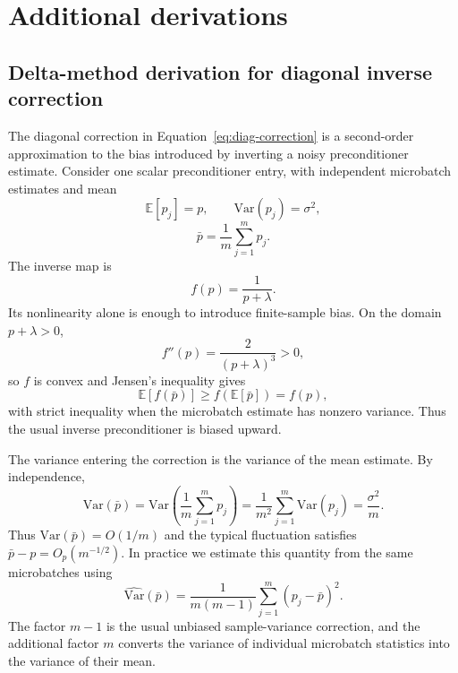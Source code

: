 \documentclass{article}
\newcommand{\E}{\mathbb{E}}
\newcommand{\Var}{\mathrm{Var}}
\begin{document}
\section{Additional derivations}
\label{app:additional-derivations}

\subsection{Delta-method derivation for diagonal inverse correction}
\label{app:delta-method-inverse}

The diagonal correction in Equation~\eqref{eq:diag-correction} is a second-order approximation to the bias introduced by inverting a noisy preconditioner estimate. Consider one scalar preconditioner entry, with independent microbatch estimates and mean
\begin{equation}
    \E[p_j]=p,
    \qquad
    \Var(p_j)=\sigma^2,
\end{equation}
\begin{equation}
    \bar p = \frac{1}{m}\sum_{j=1}^m p_j.
\end{equation}
The inverse map is
\begin{equation}
    f(p) = \frac{1}{p+\lambda}.
\end{equation}
Its nonlinearity alone is enough to introduce finite-sample bias. On the domain $p+\lambda>0$,
\begin{equation}
    f''(p)=\frac{2}{(p+\lambda)^3}>0,
\end{equation}
so $f$ is convex and Jensen's inequality gives
\begin{equation}
    \E[f(\bar p)]
    \geq
    f(\E[\bar p])
    =
    f(p),
    \label{eq:jensen-inverse-bias}
\end{equation}
with strict inequality when the microbatch estimate has nonzero variance. Thus the usual inverse preconditioner is biased upward.

The variance entering the correction is the variance of the mean estimate. By independence,
\begin{equation}
    \Var(\bar p)
    =
    \Var\left(\frac{1}{m}\sum_{j=1}^m p_j\right)
    =
    \frac{1}{m^2}\sum_{j=1}^m \Var(p_j)
    =
    \frac{\sigma^2}{m}.
    \label{eq:variance-of-mean}
\end{equation}
Thus $\Var(\bar p)=O(1/m)$ and the typical fluctuation satisfies $\bar p-p=O_p(m^{-1/2})$. In practice we estimate this quantity from the same microbatches using
\begin{equation}
    \widehat{\Var}(\bar p)
    =
    \frac{1}{m(m-1)}
    \sum_{j=1}^m (p_j-\bar p)^2.
    \label{eq:appendix-variance-of-mean-estimator}
\end{equation}
The factor $m-1$ is the usual unbiased sample-variance correction, and the additional factor $m$ converts the variance of individual microbatch statistics into the variance of their mean.
\end{document}
